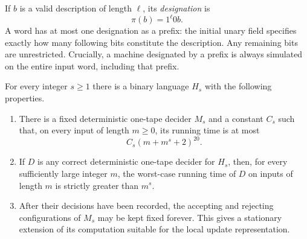 If $b$ is a valid description of length $\ell$, its \emph{designation} is
\[
                        \pi(b)=1^\ell 0b.
\]
A word has at most one designation as a prefix: the initial unary field
specifies exactly how many following bits constitute the description.
Any remaining bits are unrestricted.  Crucially, a machine designated by
a prefix is always simulated on the entire input word, including that
prefix.

\begin{theorem}
\label{diag:language}
For every integer $s\geq 1$ there is a binary language $H_s$ with the following
properties.
\begin{enumerate}
\item There is a fixed deterministic one-tape decider $M_s$ and a constant
$C_s$ such that, on every input of length $m\geq 0$, its running time is at
most
\[
                       C_s(m+m^s+2)^{20}.
\]
\item If $D$ is any correct deterministic one-tape decider for $H_s$, then,
for every sufficiently large integer $m$, the worst-case running time of
$D$ on inputs of length $m$ is strictly greater than $m^s$.
\item After their decisions have been recorded, the accepting and rejecting
configurations of $M_s$ may be kept fixed forever.  This gives a stationary
extension of its computation suitable for the local update representation.
\end{enumerate}
\end{theorem}

